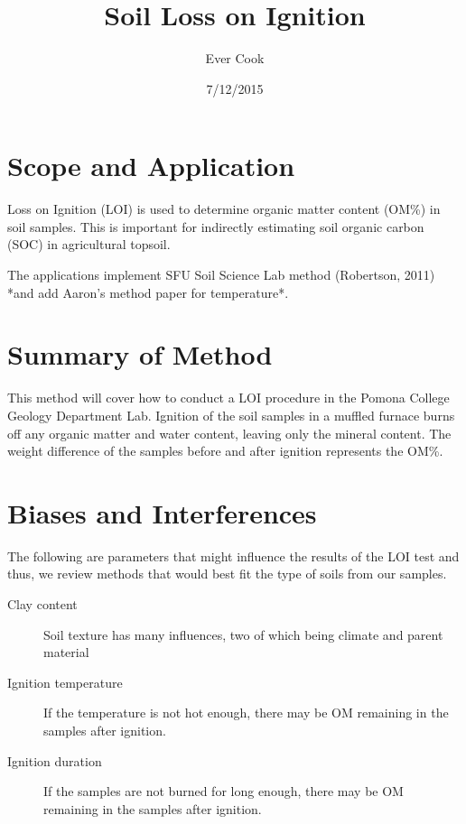 \documentclass[12pt]{../SOP4_alpha}\usepackage[]{graphicx}\usepackage[]{xcolor}
\title{Soil Loss on Ignition}
\date{7/12/2015}
\author{Ever Cook}
\begin{document}

\maketitle

\section{Scope and Application}

\NP Loss on Ignition (LOI) is used to determine organic matter content (OM\%) in soil samples. This is important for indirectly estimating soil organic carbon (SOC) in agricultural topsoil. 

\NP The applications implement SFU Soil Science Lab method (Robertson, 2011) *and add Aaron's method paper for temperature*.

\section{Summary of Method}

\NP This method will cover how to conduct a LOI procedure in the Pomona College Geology Department Lab. Ignition of the soil samples in a muffled furnace burns off any organic matter and water content, leaving only the mineral content. The weight difference of the samples before and after ignition represents the OM\%.

\tableofcontents

\newpage





\section{Biases and Interferences}

\NP The following are parameters that might influence the results of the LOI test and thus, we review methods that would best fit the type of soils from our samples.

\begin{description}
  	\item[Clay content] Soil texture has many influences, two of which being climate and parent material 
		\item [Ignition temperature] If the temperature is not hot enough, there may be OM remaining in the samples after ignition.
		\item [Ignition duration] If the samples are not burned for long enough, there may be OM remaining in the samples after ignition.
\end{description}
\end{document}
